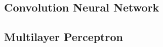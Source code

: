 \documentclass[
	article, %
	11pt, %
]{CSUniSchoolLabReport}
\begin{document}
\subsection{Convolution Neural Network}\label{cnn_visual}

\subsection{Multilayer Perceptron}\label{mlp_visual}












\end{document}
